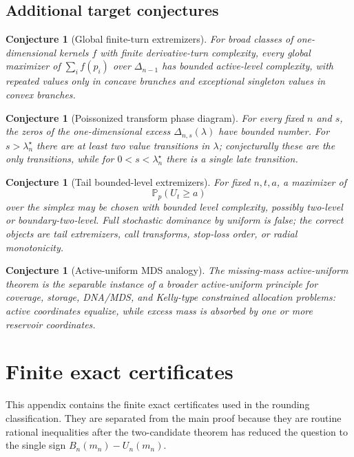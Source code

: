 \documentclass[11pt]{article}
\newtheorem{conjecture}[theorem]{Conjecture}
\theoremstyle{definition}
\newcommand{\Pp}{\mathbb P}
\begin{document}
\subsection{Additional target conjectures}

\begin{conjecture}[Global finite-turn extremizers]
For broad classes of one-dimensional kernels $f$ with finite derivative-turn complexity, every global maximizer of $\sum_i f(p_i)$ over $\Delta_{n-1}$ has bounded active-level complexity, with repeated values only in concave branches and exceptional singleton values in convex branches.
\end{conjecture}

\begin{conjecture}[Poissonized transform phase diagram]
For every fixed $n$ and $s$, the zeros of the one-dimensional excess $\Delta_{n,s}(\lambda)$ have bounded number. For $s>\lambda_n^\star$ there are at least two value transitions in $\lambda$; conjecturally these are the only transitions, while for $0<s<\lambda_n^\star$ there is a single late transition.
\end{conjecture}

\begin{conjecture}[Tail bounded-level extremizers]
For fixed $n,t,a$, a maximizer of
\[
  \Pp_p(U_t\ge a)
\]
over the simplex may be chosen with bounded level complexity, possibly two-level or boundary-two-level. Full stochastic dominance by uniform is false; the correct objects are tail extremizers, call transforms, stop-loss order, or radial monotonicity.
\end{conjecture}

\begin{conjecture}[Active-uniform MDS analogy]
The missing-mass active-uniform theorem is the separable instance of a broader active-uniform principle for coverage, storage, DNA/MDS, and Kelly-type constrained allocation problems: active coordinates equalize, while excess mass is absorbed by one or more reservoir coordinates.
\end{conjecture}


\appendix

\section{Finite exact certificates}\label{app:finite-certificates}

This appendix contains the finite exact certificates used in the rounding
classification.  They are separated from the main proof because they are
routine rational inequalities after the two-candidate theorem has reduced the
question to the single sign \(B_n(m_n)-U_n(m_n)\).
\end{document}
